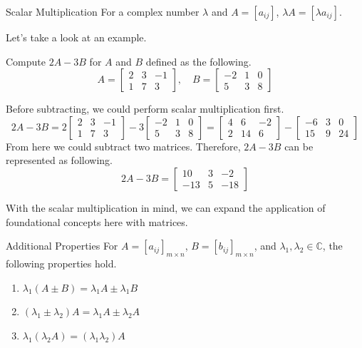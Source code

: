 \documentclass[../main.tex]{subfiles}
\begin{document}
\begin{theorem}{}{Scalar Multiplication}
For a complex number $\lambda$ and $A = [a_{ij}]$, $\lambda A
= [\lambda a_{ij}]$.
\end{theorem}

Let's take a look at an example.

\begin{problem}{}{}
Compute $2A - 3B$ for $A$ and $B$ defined as the following.
\[
A =
\begin{bmatrix}
    2 & 3 & -1 \\
    1 & 7 & 3
\end{bmatrix},
\quad
B =
\begin{bmatrix}
    -2 & 1 & 0 \\
    5  & 3 & 8
\end{bmatrix}
\]
\end{problem}
\begin{solution}
Before subtracting, we could perform scalar multiplication first.
\[
2A - 3B =
2\begin{bmatrix}
    2 & 3 & -1 \\
    1 & 7 & 3
\end{bmatrix}
-
3\begin{bmatrix}
    -2 & 1 & 0 \\
    5  & 3 & 8
\end{bmatrix}
=
\begin{bmatrix}
    4 & 6  & -2 \\
    2 & 14 & 6
\end{bmatrix}
-
\begin{bmatrix}
    -6 & 3 & 0 \\
    15 & 9 & 24
\end{bmatrix}
\]
From here we could subtract two matrices. Therefore, $2A - 3B$
can be represented as following.
\[
2A - 3B =
\begin{bmatrix}
    10  & 3  & -2 \\
    -13 & 5 & -18
\end{bmatrix}
\]
\end{solution}

With the scalar multiplication in mind, we can expand the application
of foundational concepts here with matrices.

\begin{theorem}{}{Additional Properties}
For $A = [a_{ij}]_{m \times n}$, $B = [b_{ij}]_{m \times n}$,
and $\lambda_1, \lambda_2 \in \mathbb{C}$, the following
properties hold.
\begin{enumerate}
\item $\lambda_1 (A \pm B) = \lambda_1 A \pm \lambda_1 B$
\item $(\lambda_1 \pm \lambda_2) A = \lambda_1 A \pm \lambda_2 A$
\item $\lambda_1 (\lambda_2 A) = (\lambda_1 \lambda_2) A$
\end{enumerate}
\end{theorem}
\end{document}
